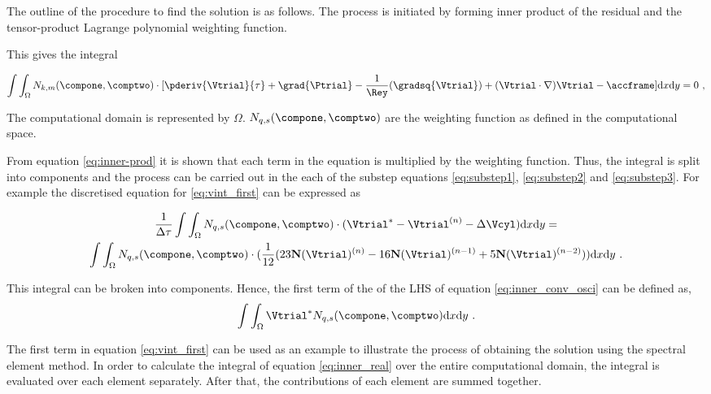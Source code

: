 The outline of the procedure to find the solution is as follows. The process is initiated by forming inner product of the residual and the tensor-product Lagrange polynomial weighting function.

This gives the integral 

 \begin{equation} \centering
 \label{eq:inner-prod}
 \int\int_{\Omega}N_{k,m}(\compone,\comptwo)\cdot[\pderiv{\Vtrial}{\tau} +\grad{\Ptrial} - \frac{1}{\Rey}(\gradsq{\Vtrial}) + (\Vtrial\cdot\nabla)\Vtrial - \accframe]\mathrm{d}x\mathrm{d}y = 0 ~,
 \end{equation}
 
The computational domain is represented by $\Omega$. $N_{q,s}(\compone,\comptwo)$ are the weighting function as defined in the computational space.

From equation \ref{eq:inner-prod} it is shown that each term in the equation is multiplied by the weighting function. Thus, the integral is split into components and the process can be carried out in the each of the substep equations \ref{eq:substep1}, \ref{eq:substep2} and \ref{eq:substep3}. For example the discretised equation for \ref{eq:vint_first} can be expressed as

\setlength{\multlinegap}{0.2\textwidth}
\begin{multline} 
\label{eq:inner_conv_osci}
\frac{1}{\Delta\tau}\int\int_{\Omega}N_{q,s}(\compone,\comptwo)\cdot(\Vtrial^{*} - \Vtrial^{(n)} - \Delta\Vcyl)\mathrm{d}x\mathrm{d}y = \\
\int\int_{\Omega}N_{q,s}(\compone,\comptwo)\cdot(\frac{1}{12}(23\mathbf{N}(\Vtrial)^{(n)} - 16\mathbf{N}(\Vtrial)^{(n-1)} + 5\mathbf{N}(\Vtrial)^{(n-2)}))\mathrm{d}x\mathrm{d}y ~.
\end{multline}

 This integral can be broken into components. Hence, the first term of the of the LHS of equation \ref{eq:inner_conv_osci} can be defined as,  
\begin{equation} \centering
\label{eq:inner_real}
\int\int_{\Omega}\Vtrial^{*} N_{q,s}(\compone,\comptwo)\mathrm{d}x\mathrm{d}y ~.
\end{equation}


The first term in equation \ref{eq:vint_first} can be used as an example to illustrate the process of obtaining the solution using the spectral element method. In order to calculate the integral of equation \ref{eq:inner_real}  over the entire computational domain, the integral is evaluated over each element separately. After that, the contributions of each element are summed together. 

